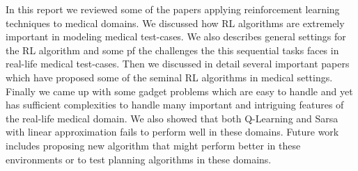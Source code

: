 In this report we reviewed some of the papers applying reinforcement learning techniques to medical domains. We discussed how RL algorithms are extremely important in modeling medical test-cases. We also describes general settings for the RL algorithm and some pf the challenges the this sequential tasks faces in real-life medical test-cases. Then we discussed in detail several important papers which have proposed some of the seminal RL algorithms in medical settings. Finally we came up with some gadget problems which are easy to handle and yet has sufficient complexities to handle many important and intriguing features of the real-life medical domain. We also showed that both Q-Learning and Sarsa with linear approximation fails to perform well in these domains. Future work includes proposing new algorithm that might perform better in these environments or to test planning algorithms in these domains.